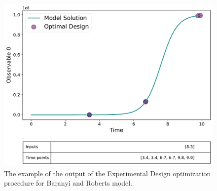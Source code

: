 \documentclass[10pt,A4paper]{article}
\begin{document}
\begin{figure}[H]
    \centering
    \includegraphics[scale=0.45]{Figures/Observables_Result_baranyi_roberts_ode_fisher_determinant_rel_sensit_cont_6times_1temps_v20_000_x_00.pdf}
    \caption{{\footnotesize The example of the output of the Experimental Design optimization procedure for Baranyi and Roberts model.}}
    \label{fig:baranyi_roberts_observable}
\end{figure}
\end{document}
